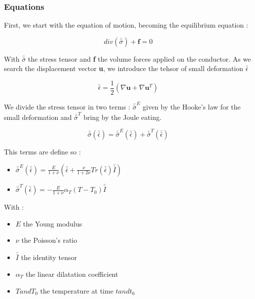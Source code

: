 \documentclass[11pt]{amsart}
\begin{document}
\hypertarget{x-equations}{\subsubsection{Equations}}
First, we start with the equation of motion, becoming the equilibrium equation :



\[
div(\bar{\bar{\sigma}})+\textbf{f}=0
\]



With $\bar{\bar{\sigma}}$ the stress tensor and \textbf{f} the volume forces applied on the conductor.
As we search the displacement vector \textbf{u}, we introduce the tehsor of small deformation $\bar{\bar{\epsilon}}$



\[
\bar{\bar{\epsilon}}=\frac{1}{2}(\nabla\textbf{u}+\nabla\textbf{u}^{T})
\]



We divide the stress tensor in two terms : $\bar{\bar{\sigma}}^{E}$ given by the Hooke’s law for the small deformation
and $\bar{\bar{\sigma}}^{T}$ bring by the Joule eating.



\[
\bar{\bar{\sigma}}(\bar{\bar{\epsilon}})=\bar{\bar{\sigma}}^{E} (\bar{\bar{\epsilon}})+\bar{\bar{\sigma}}^{T}(\bar{\bar{\epsilon}})
\]



This terms are define so :


\begin{itemize}

\item $\bar{\bar{\sigma}}^{E}(\bar{\bar{\epsilon}})=\frac{E}{1+\nu}(\bar{\bar{\epsilon}}+\frac{\nu}{1+2\nu}Tr(\bar{\bar{\epsilon}})\bar{\bar{I}})$

\item $\bar{\bar{\sigma}}^{T}(\bar{\bar{\epsilon}})=-\frac{E}{1+\nu}\alpha_{T}(T-T_{0})\bar{\bar{I}}$

\end{itemize}


With :


\begin{itemize}

\item $E$ the Young modulus

\item $\nu$ the Poisson’s ratio

\item $\bar{\bar{I}}$ the identity tensor

\item $\alpha_{T}$ the linear dilatation coefficient

\item $T and T_{0}$ the temperature at time $t and t_{0}$

\end{itemize}
\end{document}
